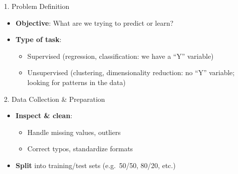 \documentclass[
  ignorenonframetext,
]{beamer}
\providecommand{\tightlist}{%
  \setlength{\itemsep}{0pt}\setlength{\parskip}{0pt}}
\begin{document}
\begin{frame}{1. Problem Definition}
\label{problem-definition}
\begin{itemize}
\tightlist
\item
  \textbf{Objective}: What are we trying to predict or learn?\\
\item
  \textbf{Type of task}:

  \begin{itemize}
  \tightlist
  \item
    Supervised (regression, classification: we have a ``Y'' variable)\\
  \item
    Unsupervised (clustering, dimensionality reduction: no ``Y''
    variable; looking for patterns in the data)
  \end{itemize}
\end{itemize}
\end{frame}

\begin{frame}{2. Data Collection \& Preparation}
\label{data-collection-preparation}
\begin{itemize}
\tightlist
\item
  \textbf{Inspect \& clean}:

  \begin{itemize}
  \tightlist
  \item
    Handle missing values, outliers\\
  \item
    Correct typos, standardize formats\\
  \end{itemize}
\item
  \textbf{Split} into training/test sets (e.g.~50/50, 80/20, etc.)
\end{itemize}
\end{frame}
\end{document}
